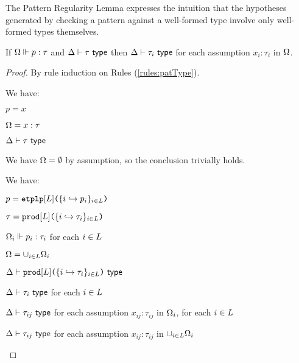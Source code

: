 {{{{The Pattern Regularity Lemma expresses the intuition that the hypotheses generated by checking a pattern against a well-formed type involve only well-formed types themselves.
\begin{lemma}\label{lemma:pattern-regularity-UP} 
If $\Omega \Vdash p : \tau$ and $\Delta \vdash \tau~\mathsf{type}$ then $\Delta \vdash \tau_i~\mathsf{type}$ for each assumption $x_i : \tau_i$ in $\Omega$.
\end{lemma}
\begin{proof} By rule induction on Rules (\ref{rules:patType}).
\begin{byCases}
\item[\text{(\ref{rule:patType-var})}] We have:
\begin{pfsteps*}
  \item $p=x$ 
  \item $\Omega=x : \tau$ 
  \item $\Delta \vdash \tau~\mathsf{type}$ 
 \end{pfsteps*}
 \resetpfcounter
\item[\text{(\ref{rule:patType-wild})}] We have $\Omega=\emptyset$ by assumption, so the conclusion trivially holds.
\item[\text{(\ref{rule:patType-tpl})}] We have:
\begin{pfsteps*}
  \item $p=\texttt{etplp}[L]\texttt{(}\{i \hookrightarrow p_{i}\}_{i \in L}\texttt{)}$ 
  \item $\tau=\texttt{prod}[L]\texttt{(}\{i \hookrightarrow \tau_{i}\}_{i \in L}\texttt{)}$ 
  \item $\Omega_i \Vdash p_i : \tau_i$ for each $i \in L$ 
  \item $\Omega=\cup_{i \in L} \Omega_i$ 
  \item $\Delta \vdash \texttt{prod}[L]\texttt{(}\{i \hookrightarrow \tau_{i}\}_{i \in L}\texttt{)}~\mathsf{type}$  
  \item $\Delta \vdash \tau_i~\mathsf{type}$ for each $i \in L$ 
  \item $\Delta \vdash \tau_{ij}~\mathsf{type}$ for each assumption $x_{ij} : \tau_{ij}$ in $\Omega_i$, for each $i \in L$  
  \item $\Delta \vdash \tau_{ij}~\mathsf{type}$ for each assumption $x_{ij} : \tau_{ij}$ in $\cup_{i \in L}\Omega_i$ 

\end{pfsteps*}
\end{byCases}
\end{proof}}}}}
